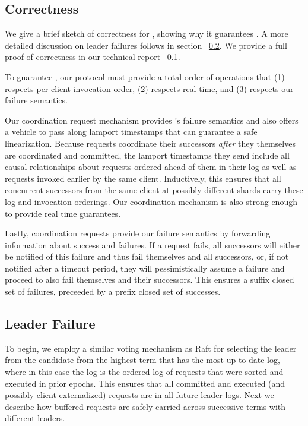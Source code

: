 \subsection{Correctness}
We give a brief sketch of correctness for \protocol, showing why it guarantees \mdl. A more detailed discussion on leader failures follows in section ~\ref{subsec:leaderfailures}. We provide a full proof of correctness in our technical report ~\ref{}.

To guarantee \mdl, our protocol must provide a total order of operations that (1) respects per-client invocation order, (2) respects real time, and (3) respects our failure semantics. 

Our coordination request mechanism provides \md's failure semantics and also offers a vehicle to pass along lamport timestamps that can guarantee a safe linearization. Because requests coordinate their successors \textit{after} they themselves are coordinated and committed, the lamport timestamps they send include all causal relationships about requests ordered ahead of them in their log as well as requests invoked earlier by the same client. 
Inductively, this ensures that all concurrent successors from the same client at possibly different shards carry these log and invocation orderings. Our coordination mechanism is also strong enough to provide real time guarantees.

Lastly, coordination requests provide our failure semantics by forwarding information about success and failures. If a request fails, all successors will either be notified of this failure and thus fail themselves and all successors, or, if not notified after a timeout period, they will pessimistically assume a failure and proceed to also fail themselves and their successors. This ensures a suffix closed set of failures, preceeded by a prefix closed set of successes.

\subsection{Leader Failure}
\label{subsec:leaderfailures}
To begin, we employ a similar voting mechanism as Raft for selecting the leader from the candidate from the highest term that has the most up-to-date log, where in this case the log is the ordered log of requests that were sorted and executed in prior epochs. This ensures that all committed and executed (and possibly client-externalized) requests are in all future leader logs. Next we describe how buffered requests are safely carried across successive terms with different leaders.

